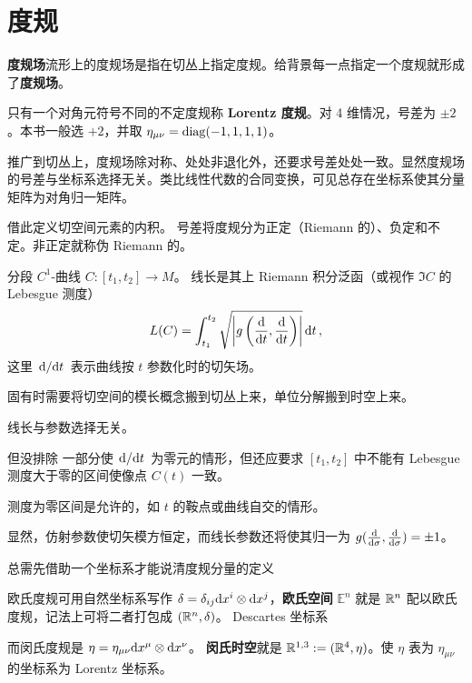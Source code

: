 \chapter{度规}

\begin{definition}
    \textbf{度规场}流形上的度规场是指在切丛上指定度规。给背景每一点指定一个度规就形成了\textbf{度规场}。

    只有一个对角元符号不同的不定度规称 \textbf{Lorentz 度规}。对 4 维情况，号差为 $\pm 2$。本书一般选 $+2$，并取 $\eta_{\mu\nu}=\operatorname{diag}(-1,1,1,1)$。

    推广到切丛上，度规场除对称、处处非退化外，还要求号差处处一致。显然度规场的号差与坐标系选择无关。类比线性代数的合同变换，可见总存在坐标系使其分量矩阵为对角归一矩阵。
\end{definition}

借此定义切空间元素的内积。
号差将度规分为正定（Riemann 的）、负定和不定。非正定就称伪 Riemann 的。

\begin{definition}
    分段 $C^1$-曲线 $C:[t_1,t_2]\to M$。
线长是其上 Riemann 积分泛函（或视作 $\Im C$ 的 Lebesgue 测度）
    \[L(C)=\int_{t_1}^{t_2} \sqrt{\abs{g\left(\dv{t},\dv{t}\right)}}\dd{t},\]
    这里 $\dv*{t}$ 表示曲线按 $t$ 参数化时的切矢场。
\end{definition}

固有时需要将切空间的模长概念搬到切丛上来，单位分解搬到时空上来。

\begin{theorem}
    线长与参数选择无关。
\end{theorem}

\begin{remark}
    但没排除
    一部分使 $\dv*{t}$ 为零元的情形，但还应要求 $[t_1,t_2]$ 中不能有 Lebesgue 测度大于零的区间使像点 $C(t)$ 一致。
    
    测度为零区间是允许的，如 $t$ 的鞍点或曲线自交的情形。
\end{remark}
     显然，仿射参数使切矢模方恒定，而线长参数还将使其归一为 $g(\dv{\sigma},\dv{\sigma})=\pm 1$。


总需先借助一个坐标系才能说清度规分量的定义

\begin{definition}
    欧氏度规可用自然坐标系写作 $\delta=\delta_{ij}\dd x^i\otimes\dd x^j$，\textbf{欧氏空间} $\mathbb{E}^n$ 就是 $\mathbb{R}^n$ 配以欧氏度规，记法上可将二者打包成 $(\mathbb{R}^n,\delta)$。
Descartes 坐标系
    
    而闵氏度规是 $\eta=\eta_{\mu\nu}\dd x^\mu\otimes\dd x^\nu$。
    \textbf{闵氏时空}就是 $\mathbb{R}^{1,3}:=(\mathbb{R}^4,\eta)$。使 $\eta$ 表为 $\eta_{\mu\nu}$ 的坐标系为 Lorentz 坐标系。
\end{definition}

